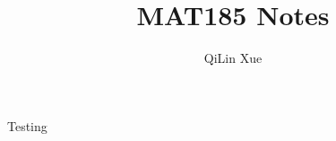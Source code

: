 \documentclass{article}
\title{MAT185 Notes}
\author{QiLin Xue}
\begin{document}
    \maketitle
    \begin{definition}
        Testing
    \end{definition}
\end{document}
